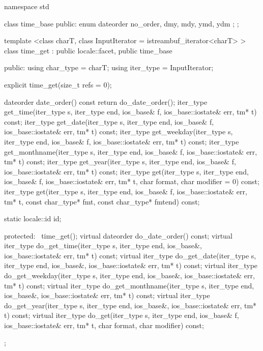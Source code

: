 %
\begin{codeblock}
namespace std {
  class time_base {
  public:
    enum dateorder { no_order, dmy, mdy, ymd, ydm };
  };

  template <class charT, class InputIterator = istreambuf_iterator<charT> >
  class time_get : public locale::facet, public time_base {
  public:
    using char_type = charT;
    using iter_type = InputIterator;

    explicit time_get(size_t refs = 0);

    dateorder date_order()  const { return do_date_order(); }
    iter_type get_time(iter_type s, iter_type end, ios_base& f,
                       ios_base::iostate& err, tm* t)  const;
    iter_type get_date(iter_type s, iter_type end, ios_base& f,
                       ios_base::iostate& err, tm* t)  const;
    iter_type get_weekday(iter_type s, iter_type end, ios_base& f,
                       ios_base::iostate& err, tm* t) const;
    iter_type get_monthname(iter_type s, iter_type end, ios_base& f,
                       ios_base::iostate& err, tm* t) const;
    iter_type get_year(iter_type s, iter_type end, ios_base& f,
                       ios_base::iostate& err, tm* t) const;
    iter_type get(iter_type s, iter_type end, ios_base& f,
                       ios_base::iostate& err, tm* t, char format, char modifier = 0) const;
    iter_type get(iter_type s, iter_type end, ios_base& f,
                       ios_base::iostate& err, tm* t, const char_type* fmt,
                       const char_type* fmtend) const;

    static locale::id id;

  protected:
    ~time_get();
    virtual dateorder do_date_order()  const;
    virtual iter_type do_get_time(iter_type s, iter_type end, ios_base&,
                                  ios_base::iostate& err, tm* t) const;
    virtual iter_type do_get_date(iter_type s, iter_type end, ios_base&,
                                  ios_base::iostate& err, tm* t) const;
    virtual iter_type do_get_weekday(iter_type s, iter_type end, ios_base&,
                                     ios_base::iostate& err, tm* t) const;
    virtual iter_type do_get_monthname(iter_type s, iter_type end, ios_base&,
                                       ios_base::iostate& err, tm* t) const;
    virtual iter_type do_get_year(iter_type s, iter_type end, ios_base&,
                                  ios_base::iostate& err, tm* t) const;
    virtual iter_type do_get(iter_type s, iter_type end, ios_base& f,
                             ios_base::iostate& err, tm* t, char format, char modifier) const;
  };
}
\end{codeblock}

